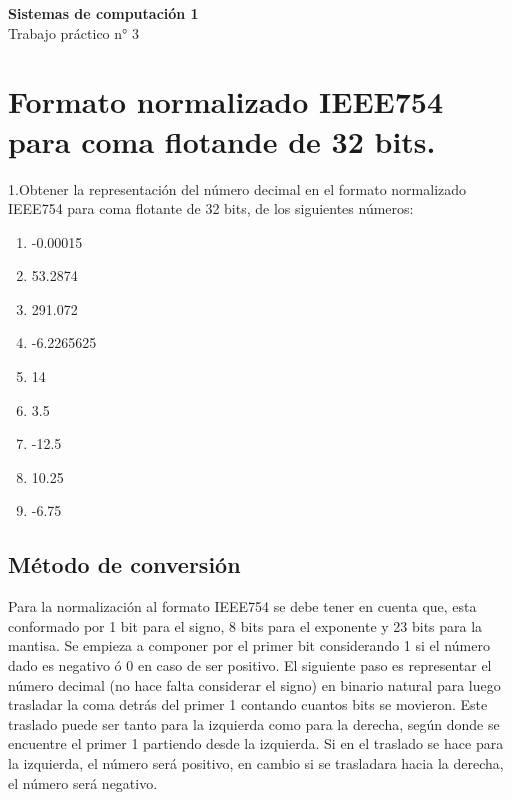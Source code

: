 \documentclass[a4paper,12pt]{article}
\begin{document}
	
	\begin{center}
		
		\LARGE \textbf{Sistemas de computación 1} \\[0.5cm]
		\LARGE Trabajo práctico n° 3 \\
	\end{center}
	
	\section*{Formato normalizado IEEE754 para coma flotande de 32 bits.}
	
	1.Obtener la representación del número decimal en el formato normalizado IEEE754 para coma flotante de 32 bits, de los siguientes números:
	\begin{enumerate}
		\item -0.00015
		\item 53.2874
		\item 291.072
		\item -6.2265625
		\item 14
		\item 3.5
		\item -12.5
		\item 10.25
		\item -6.75	
	\end{enumerate}	

	\subsection*{Método de conversión}
	Para la normalización al formato IEEE754 se debe tener en cuenta que, esta conformado por 1 bit para el signo, 8 bits para el exponente y 23 bits para la mantisa. Se empieza a componer por el primer bit considerando 1 si el número dado es negativo ó 0 en caso de ser positivo. El siguiente paso es representar el número decimal (no hace falta considerar el signo) en binario natural para luego trasladar la coma detrás del primer 1 contando cuantos bits se movieron. Este traslado puede ser tanto para la izquierda como para la derecha, según donde se encuentre el primer 1 partiendo desde la izquierda. Si en el traslado se hace para la izquierda, el número será positivo, en cambio si se trasladara hacia la derecha, el número será negativo. 
	
\end{document}
